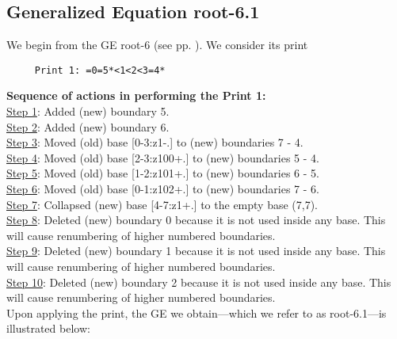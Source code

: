 \documentclass[final]{article}
\begin{document}
\subsection*{Generalized Equation root-6.1}
\label{root-6.1}We begin from the GE root-6 (see pp. \pageref{root-6}).  {We consider its print}
\begin{verbatim}
     Print 1: =0=5*<1<2<3=4*
\end{verbatim}
{\bf Sequence of actions in performing the Print 1:}\\
{\underline{Step 1}:} Added (new) boundary 5.\\
{\underline{Step 2}:} Added (new) boundary 6.\\
{\underline{Step 3}:} Moved (old) base [0-3:z1-.]  to (new) boundaries 7 - 4.\\
{\underline{Step 4}:} Moved (old) base [2-3:z100+.]  to (new) boundaries 5 - 4.\\
{\underline{Step 5}:} Moved (old) base [1-2:z101+.]  to (new) boundaries 6 - 5.\\
{\underline{Step 6}:} Moved (old) base [0-1:z102+.]  to (new) boundaries 7 - 6.\\
{\underline{Step 7}:} Collapsed (new) base [4-7:z1+.]  to the empty base (7,7).
\\
{\underline{Step 8}:} Deleted (new) boundary 0 because it is not used inside any base.  This will cause renumbering of higher numbered boundaries.
\\
{\underline{Step 9}:} Deleted (new) boundary 1 because it is not used inside any base.  This will cause renumbering of higher numbered boundaries.
\\
{\underline{Step 10}:} Deleted (new) boundary 2 because it is not used inside any base.  This will cause renumbering of higher numbered boundaries.
\\[0.1in]
{Upon applying the print, the GE we obtain---which we refer to as root-6.1---is illustrated below:}
\end{document}
